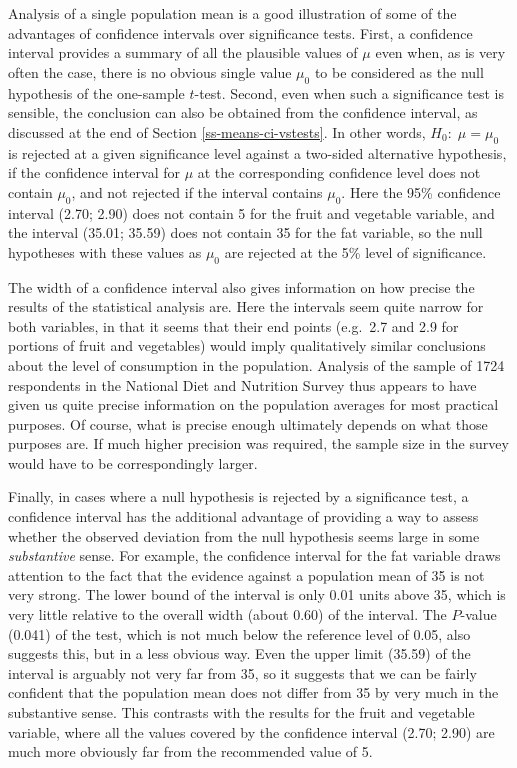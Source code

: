 \documentclass[11pt,a4paper,openany]{book}
\begin{document}
Analysis of a single population mean is a good illustration of some of
the advantages of confidence intervals over significance tests. First, a
confidence interval provides a summary of all the plausible values of
\(\mu\) even when, as is very often the case, there is no obvious single
value \(\mu_{0}\) to be considered as the null hypothesis of the
one-sample \(t\)-test. Second, even when such a significance test is
sensible, the conclusion can also be obtained from the confidence
interval, as discussed at the end of Section \ref{ss-means-ci-vstests}.
In other words, \(H_{0}:\; \mu=\mu_{0}\) is rejected at a given
significance level against a two-sided alternative hypothesis, if the
confidence interval for \(\mu\) at the corresponding confidence level
does not contain \(\mu_{0}\), and not rejected if the interval contains
\(\mu_{0}\). Here the 95\% confidence interval (2.70; 2.90) does not
contain 5 for the fruit and vegetable variable, and the interval (35.01;
35.59) does not contain 35 for the fat variable, so the null hypotheses
with these values as \(\mu_{0}\) are rejected at the 5\% level of
significance.

The width of a confidence interval also gives information on how precise
the results of the statistical analysis are. Here the intervals seem
quite narrow for both variables, in that it seems that their end points
(e.g.~2.7 and 2.9 for portions of fruit and vegetables) would imply
qualitatively similar conclusions about the level of consumption in the
population. Analysis of the sample of 1724 respondents in the National
Diet and Nutrition Survey thus appears to have given us quite precise
information on the population averages for most practical purposes. Of
course, what is precise enough ultimately depends on what those purposes
are. If much higher precision was required, the sample size in the
survey would have to be correspondingly larger.

Finally, in cases where a null hypothesis is rejected by a significance
test, a confidence interval has the additional advantage of providing a
way to assess whether the observed deviation from the null hypothesis
seems large in some \emph{substantive} sense. For example, the
confidence interval for the fat variable draws attention to the fact
that the evidence against a population mean of 35 is not very strong.
The lower bound of the interval is only 0.01 units above 35, which is
very little relative to the overall width (about 0.60) of the interval.
The \(P\)-value (0.041) of the test, which is not much below the
reference level of 0.05, also suggests this, but in a less obvious way.
Even the upper limit (35.59) of the interval is arguably not very far
from 35, so it suggests that we can be fairly confident that the
population mean does not differ from 35 by very much in the substantive
sense. This contrasts with the results for the fruit and vegetable
variable, where all the values covered by the confidence interval (2.70;
2.90) are much more obviously far from the recommended value of 5.
\end{document}
